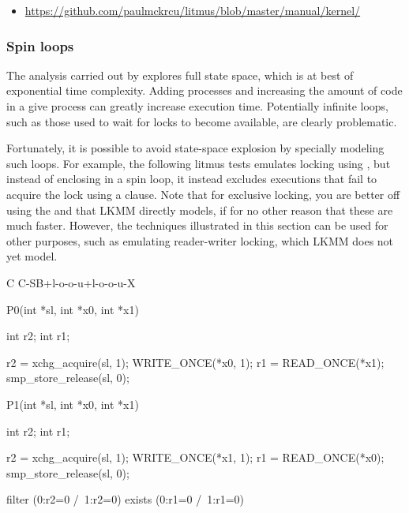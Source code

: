\begin{itemize}
  \item	\url{https://github.com/paulmckrcu/litmus/blob/master/manual/kernel/}
\end{itemize}


\subsubsection{Spin loops}

The analysis carried out by  explores full state space, which is
at best of exponential time complexity.
Adding processes and increasing the amount of code in a give process can
greatly increase execution time.
Potentially infinite loops, such as those used to wait for locks to become
available, are clearly problematic.

Fortunately, it is possible to avoid state-space explosion by specially
modeling such loops.
For example, the following litmus tests emulates locking using
, but instead of enclosing 
in a spin loop, it instead excludes executions that fail to acquire the
lock using a   clause.
Note that for exclusive locking, you are better off using the 
and  that LKMM directly models, if for no other reason
that these are much faster.
However, the techniques illustrated in this section can be used for other
purposes, such as emulating reader-writer locking, which LKMM does not yet
model.

\begin{fcvlabel}
\begin{VerbatimN}[commandchars=\%\@\$]
	C C-SB+l-o-o-u+l-o-o-u-X

	{
	}

	P0(int *sl, int *x0, int *x1)
	{
		int r2;
		int r1;

		r2 = xchg_acquire(sl, 1);   %
		WRITE_ONCE(*x0, 1);         %
		r1 = READ_ONCE(*x1);        %
		smp_store_release(sl, 0);   %
	}

	P1(int *sl, int *x0, int *x1)
	{
		int r2;
		int r1;

		r2 = xchg_acquire(sl, 1);
		WRITE_ONCE(*x1, 1);
		r1 = READ_ONCE(*x0);
		smp_store_release(sl, 0);
}

	filter (0:r2=0 /\ 1:r2=0)        %
	exists (0:r1=0 /\ 1:r1=0)
\end{VerbatimN}
\end{fcvlabel}

